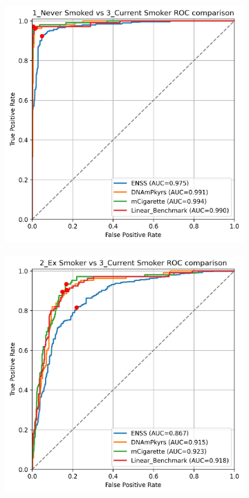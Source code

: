 \documentclass[draft]{article} %
\begin{document}
\begin{figure}[p]
    \centering
    \begin{subfigure}{0.48\linewidth}
        \centering
        \includegraphics[width=\linewidth]{comparison_1v3.png}
    \end{subfigure}
    \hfill
    \begin{subfigure}{0.48\linewidth}
        \centering
        \includegraphics[width=\linewidth]{comparison_2v3.png}

\end{subfigure}
\end{figure}
\end{document}
